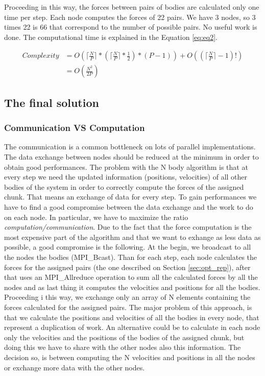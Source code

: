 \documentclass[a4paper]{article}
\begin{document}
Proceeding in this way, the forces between pairs of bodies are calculated only one time per step. Each node computes the forces of 22 pairs. We have 3 nodes, so 3 times 22 is 66 that correspond to the number of possible pairs. No useful work is done. The computational time is explained in the Equation \ref{eq:eq2}.

\begin{equation} \label{eq:eq2}
\begin{split}
Complexity & = O(\lceil\frac{N}{P}\rceil * (\lceil\frac{N}{P}\rceil * \frac{1}{2}) * (P-1)) + O((\lceil\frac{N}{P}\rceil-1)!)\\
 & = O(\frac{N^2}{2P})
\end{split}
\end{equation}

\subsection{The final solution}
\label{sec:comm_comp}

\subsubsection{Communication VS Computation}
\label{sec:comm_comp}
The communication is a common bottleneck on lots of parallel implementations. The data exchange between nodes should be reduced at the minimum in order to obtain good performances. The problem with the N body algorithm is that at every step we need the updated information (positions, velocities) of all other bodies of the system in order to correctly compute the forces of the assigned chunk. That means an exchange of data for every step. To gain performances we have to find a good compromise between the data exchange and the work to do on each node. In particular, we have to maximize the ratio \textit{computation/communication}. Due to the fact that the force computation is the most expensive part of the algorithm and that we want to exhange as less data as possible, a good compromise is the following. At the begin, we broadcast to all the nodes the bodies (MPI\_Bcast). Than for each step, each node calculates the forces for the assigned pairs (the one described on Section \ref{sec:opt_rep}), after that uses an MPI\_Allreduce operation to sum all the calculated forces by all the nodes and as last thing it computes the velocities and positions for all the bodies. Proceeding i this way, we exchange only an array of N elements containing the forces calculated for the assigned pairs. The major problem of this approach, is that we calculate the positions and velocities of all the bodies in every node, that represent a duplication of work. An alternative could be to calculate in each node only the velocities and the positions of the bodies of the assigned chunk, but doing this we have to share with the other nodes also this information. The decision so, is between computing the N velocities and positions in all the nodes or exchange more data with the other nodes. 
\end{document}
